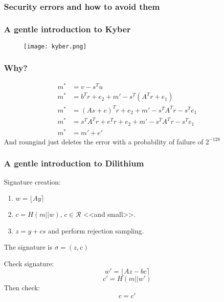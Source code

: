 \documentclass[presentation]{beamer}
\begin{document}
\begin{frame}[label=security-errors-and-how-to-avoid-them]
  \frametitle{Security errors and how to avoid them}

\end{frame}
\begin{frame}[label=a-gentle-introduction-to-kyber]
  \frametitle{A gentle introduction to Kyber}
  \begin{figure}
  \centering
  \texttt{[image: kyber.png]}
  \end{figure}
\end{frame}
\begin{frame}
  \frametitle{Why?}
  \begin{equation}
    \begin{array}{rl}
      m^* &= v - s^T u \\
      m^* &= b^T r + e_2 + m' - s^T(A^T r + e_1) \\
      m^* &= (As+e)^Tr + e_2 + m' - s^TA^Tr - s^Te_1 \\
      m^* &= s^TA^Tr + e^Tr + e_2 + m'  - s^TA^Tr - s^Te_1 \\
      m^* &= m' + e'
    \end{array}
  \end{equation}
  And roungind just deletes the error with a probability of
  failure of $2^{-128}$
\end{frame}
\begin{frame}[label=a-gentle-introduction-to-dilithium]
  \frametitle{A gentle introduction to Dilithium}
  Signature creation:
  \begin{enumerate} 
    \item $w = \lfloor Ay \rceil$
    \item $c = H(m || w)$, $c \in \mathcal R$ <<and small>>.
    \item $z = y + cs$ and perform rejection sampling.
  \end{enumerate}
  The signature is $\sigma = (z, c)$
  \pause

  Check signature:
  \[w' = \lfloor Az - bc \rceil \]
  \[c' = H(m || w') \]
  Then check:
  \[c = c'\]
\end{frame}
\end{document}
